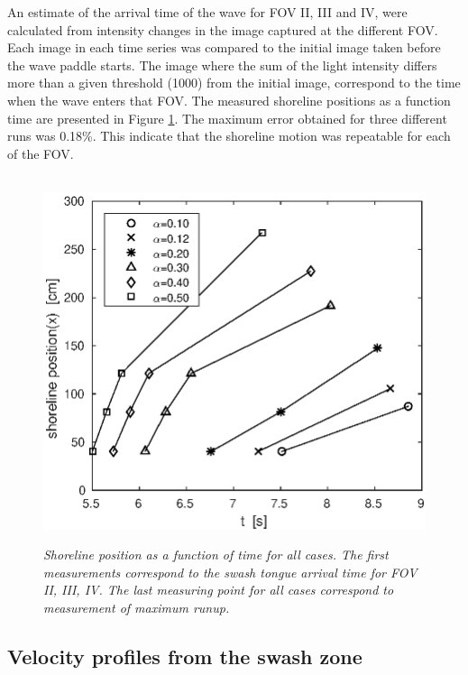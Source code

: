 \documentclass[review, authoryear]{elsarticle}
\begin{document}
An estimate of the arrival time of the wave for FOV II, III and IV, were calculated from intensity changes in the image captured at the different FOV.  Each image in each time series was compared to the initial image taken before the wave paddle starts. The image where the sum of the light intensity differs more than a given threshold (1000) from the initial image, correspond to the time when the wave enters that FOV. The measured shoreline positions as a function time are presented in Figure \ref{fig:arr_tim}. The maximum error obtained for three different runs was 0.18\%. This indicate that the shoreline motion was repeatable for each of the FOV.
\begin{figure}
        \centering
        ~ %
                \includegraphics[scale=0.6]{./Figures/shoreline2016.eps}
                \caption{\textit{Shoreline position as a function of time for all cases. The first measurements correspond to the swash tongue arrival time for FOV II, III, IV. The last measuring point for all cases correspond to measurement of maximum runup.}}
              \label{fig:arr_tim}
      \end{figure}


\subsection{Velocity profiles from the swash zone}
\label{vel_pro}
\end{document}
